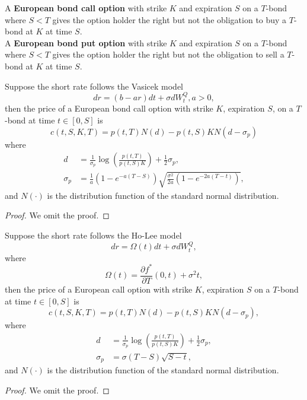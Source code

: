 \documentclass[11pt,fleqn]{book} %
\begin{document}
\begin{definition} \label{def:5311}
A \textbf{European bond call option} with strike \(K\) and expiration \(S\) on a \(T\)-bond where \(S < T\) gives the option holder the right but not the obligation to buy a \(T\)-bond at \(K\) at time \(S\). \\
A \textbf{European bond put option} with strike \(K\) and expiration \(S\) on a \(T\)-bond where \(S < T\) gives the option holder the right but not the obligation to sell a \(T\)-bond at \(K\) at time \(S\).
\end{definition}

\begin{proposition} \label{prop:5312}
Suppose the short rate follows the Vasicek model
\[
dr = (b - ar)dt + \sigma dW_t^Q, a > 0,
\]
then the price of a European bond call option with strike \(K\), expiration \(S\), on a \(T\)-bond at time \(t \in [0, S]\) is
\[
c(t, S, K, T) = p(t, T)N(d) - p(t, S)KN(d - \sigma_p)
\]
where
\[
\begin{aligned}
d &= \frac{1}{\sigma_p}\log\left(\frac{p(t, T)}{p(t, S)K}\right) + \frac12\sigma_p, \\
\sigma_p &= \frac{1}{a}(1 - e^{-a(T - S)})\sqrt{\frac{\sigma^2}{2a}(1 - e^{-2a(T - t)})},
\end{aligned}
\]
and \(N(\cdot)\) is the distribution function of the standard normal distribution.
\end{proposition}
\begin{proof}
    We omit the proof.
\end{proof}

\begin{proposition}
Suppose the short rate follows the Ho-Lee model
\[
dr = \Omega(t)dt + \sigma dW_t^Q,
\]
where
\[
\Omega(t) = \frac{\partial f^*}{\partial T}(0, t) + \sigma^2 t,
\]
then the price of a European call option with strike \(K\), expiration \(S\) on a \(T\)-bond at time \(t \in [0, S]\) is
\[
c(t, S, K, T) = p(t, T)N(d) - p(t, S)KN(d - \sigma_p),
\]
where
\[
\begin{aligned}
d &= \frac{1}{\sigma_p}\log\left(\frac{p(t, T)}{p(t, S)K}\right) + \frac12\sigma_p,\\
\sigma_p &= \sigma(T - S)\sqrt{S - t},
\end{aligned}
\]
and \(N(\cdot)\) is the distribution function of the standard normal distribution.
\end{proposition}
\begin{proof}
    We omit the proof.
\end{proof}


\cleardoublepage %
\setlength{\columnsep}{0.75cm} %
\printindex %

\end{document}
